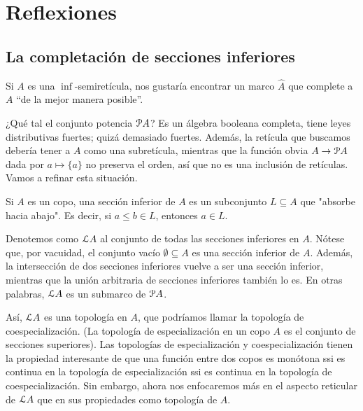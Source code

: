 \section{Reflexiones}

\subsection{La completación de secciones inferiores}
Si $A$ es una $\inf$-semiretícula, nos gustaría encontrar un
marco $\hat A$ que complete a $A$ ``de la mejor manera posible''.

¿Qué tal el conjunto potencia $\cal PA$?
Es un álgebra booleana completa, tiene leyes distributivas
fuertes; quizá demasiado fuertes.
Además, la retícula que buscamos debería tener a $A$ como una
subretícula, mientras que
la función obvia $A\to\cal PA$ dada por $a\mapsto\{a\}$
no preserva el orden, así que no es una inclusión de
retículas.
Vamos a refinar esta situación.

Si $A$ es un copo, una sección inferior de $A$
es un subconjunto $L\subseteq A$ que "absorbe hacia abajo".
Es decir, si $a\leq b\in L$, entonces $a\in L$.

Denotemos como $\cal LA$ al conjunto de todas las secciones
inferiores en $A$.
Nótese que, por vacuidad, el conjunto vacío
$\emptyset\subseteq A$ es una sección inferior de $A$.
Además, la intersección de dos secciones
inferiores vuelve a ser una sección inferior, mientras que la
unión arbitraria de secciones inferiores también lo es.
En otras palabras, $\cal LA$ es un submarco de $\cal PA$.

Así, $\cal LA$ es una topología en $A$, que podríamos llamar la
topología de coespecialización. (La topología de especialización
en un copo $A$ es el conjunto de secciones superiores).
Las topologías de especialización y coespecialización tienen la
propiedad interesante de que una función entre dos copos es
monótona ssi es continua en la topología de
especialización ssi es continua en la topología de
coespecialización.
Sin embargo, ahora nos enfocaremos más en el aspecto reticular
de $\cal LA$ que en sus propiedades como topología de $A$.

